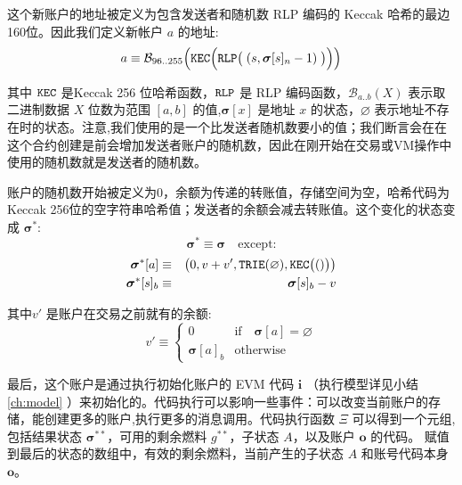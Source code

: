 \documentclass[9pt,oneside]{amsart}
\begin{document}
\begin{multicols}{2}
这个新账户的地址被定义为包含发送者和随机数 RLP 编码的 Keccak 哈希的最边160位。因此我们定义新帐户 $a$ 的地址:
\begin{equation}
a \equiv \mathcal{B}_{96..255}\Big(\mathtt{\tiny KEC}\Big(\mathtt{\tiny RLP}\big(\;(s, \boldsymbol{\sigma}[s]_n - 1)\;\big)\Big)\Big)
\end{equation}

其中 $\mathtt{\tiny KEC}$ 是Keccak 256 位哈希函数，$\mathtt{\tiny RLP}$ 是 RLP 编码函数，$\mathcal{B}_{a..b}(X)$ 表示取二进制数据 $X$ 位数为范围 $[a, b]$ 的值,$\boldsymbol{\sigma}[x]$ 是地址 $x$ 的状态，$\varnothing$ 表示地址不存在时的状态。注意,我们使用的是一个比发送者随机数要小的值；我们断言会在在这个合约创建是前会增加发送者账户的随机数，因此在刚开始在交易或VM操作中使用的随机数就是发送者的随机数。

账户的随机数开始被定义为0，余额为传递的转账值，存储空间为空，哈希代码为Keccak 256位的空字符串哈希值；发送者的余额会减去转账值。这个变化的状态变成 $\boldsymbol{\sigma}^*$:
\begin{equation}
\boldsymbol{\sigma}^* \equiv \boldsymbol{\sigma} \quad \text{except:}
\end{equation}
\begin{eqnarray}
\boldsymbol{\sigma}^*[a] &\equiv& \big( 0, v + v', \mathtt{\tiny TRIE}(\varnothing), \mathtt{\tiny KEC}\big(()\big) \big) \\
\boldsymbol{\sigma}^*[s]_b &\equiv& \boldsymbol{\sigma}[s]_b - v
\end{eqnarray}

其中$v'$ 是账户在交易之前就有的余额:
\begin{equation}
v' \equiv \begin{cases}
0 & \text{if} \quad \boldsymbol{\sigma}[a] = \varnothing\\
\boldsymbol{\sigma}[a]_b & \text{otherwise}
\end{cases}
\end{equation}

最后，这个账户是通过执行初始化账户的 EVM 代码 $\mathbf{i}$ （执行模型详见小结 \ref{ch:model} ）来初始化的。代码执行可以影响一些事件：可以改变当前账户的存储，能创建更多的账户,执行更多的消息调用。代码执行函数 $\Xi$ 可以得到一个元组,包括结果状态 $\boldsymbol{\sigma}^{**}$，可用的剩余燃料 $g^{**}$，子状态 $A$，以及账户 $\mathbf{o}$ 的代码。    赋值到最后的状态的数组中，有效的剩余燃料，当前产生的子状态 $A$ 和账号代码本身 $\mathbf{o}$。


\end{multicols}
\end{document}
